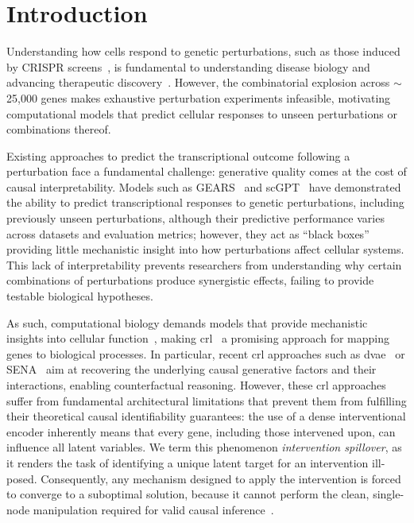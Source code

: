 \section{Introduction}
\label{sec:introduction}

Understanding how cells respond to genetic perturbations, such as those induced by CRISPR screens~\cite{dixit2016perturb}, is fundamental to understanding disease biology and advancing therapeutic discovery~\cite{adamson2016multiplexed,norman2019exploring}.
However, the combinatorial explosion across $\sim$25,000 genes makes exhaustive perturbation experiments infeasible, motivating computational models that predict cellular responses to unseen perturbations or combinations thereof.

Existing approaches to predict the transcriptional outcome following a perturbation face a fundamental challenge: generative quality comes at the cost of causal interpretability.
Models such as GEARS~\cite{roohani2024predicting} and scGPT~\cite{cui2024scgpt} have demonstrated the ability to predict transcriptional responses to genetic perturbations, including previously unseen perturbations, although their predictive performance varies across datasets and evaluation metrics; however, they act as ``black boxes'' providing little mechanistic insight into how perturbations affect cellular systems.
This lack of interpretability prevents researchers from understanding why certain combinations of perturbations produce synergistic effects, failing to provide testable biological hypotheses.

As such, computational biology demands models that provide mechanistic insights into cellular function~\cite{chen_applying_2024}, making \gls{crl}~\cite{scholkopf2021toward} a promising approach for mapping genes to biological processes.
In particular, recent \gls{crl} approaches such as \gls{dvae}~\cite{zhang2023identifiability} or SENA~\cite{de2025interpretable} aim at recovering the underlying causal generative factors and their interactions, enabling counterfactual reasoning.
However, these \gls{crl} approaches suffer from fundamental architectural limitations that prevent them from fulfilling their theoretical causal identifiability guarantees: the use of a dense interventional encoder inherently means that every gene, including those intervened upon, can influence all latent variables.
We term this phenomenon \emph{intervention spillover}, as it renders the task of identifying a unique latent target for an intervention ill-posed.
Consequently, any mechanism designed to apply the intervention is forced to converge to a suboptimal solution, because it cannot perform the clean, single-node manipulation required for valid causal inference~\cite{brehmer2022weakly,lippe2022citris}.

